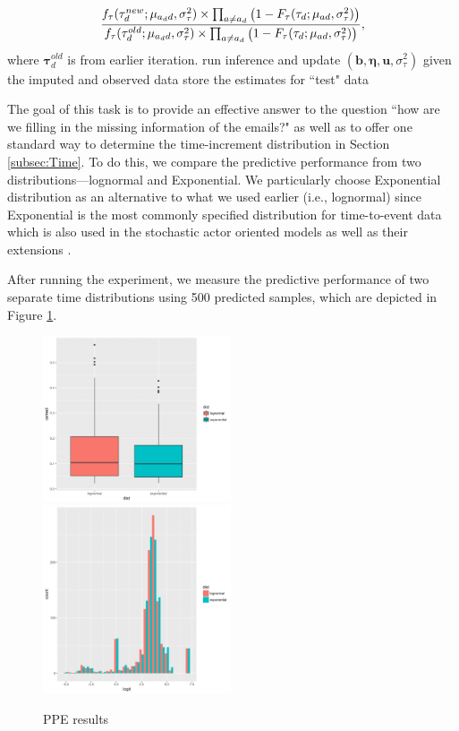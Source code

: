\documentclass[12pt]{article}
\begin{document}
{\begin{algorithm}[!t]
\begin{algorithmic}
\begin{equation*}
			\footnotesize
			\frac{f_{\tau}(\tau^{new}_{d}; \mu_{a_d d}, \sigma_\tau^2)\times \prod_{a\neq a_d}\big(1-F_{\tau}(\tau_{d}; \mu_{a d}, \sigma_\tau^2) \big) }{f_{\tau}(\tau^{old}_{d}; \mu_{a_d d}, \sigma_\tau^2)\times \prod_{a\neq a_d}\big(1-F_{\tau}(\tau_{d}; \mu_{a d}, \sigma_\tau^2) \big)},
			\end{equation*}
			where $\boldsymbol{\tau}^{old}_d$ is from earlier iteration.
			\ENDIF
			\STATE run inference and update $(\boldsymbol{b}, \boldsymbol{\eta},\boldsymbol{u}, \sigma^2_\tau)$ given the imputed and observed data
			\ENDFOR
			\STATE store the estimates for ``test" data
			\ENDFOR
		\end{algorithmic}
	\end{algorithm}
	
The goal of this task is to provide an effective answer to the question ``how are we filling in the missing information of the emails?" as well as to offer one standard way to determine the time-increment distribution in Section \ref{subsec:Time}. To do this, we compare the predictive performance from two distributions---lognormal and Exponential. We particularly choose Exponential distribution as an alternative to what we used earlier (i.e., lognormal) since Exponential is the most commonly specified distribution for time-to-event data which is also used in the stochastic actor oriented models \citep{snijders1996stochastic} as well as their extensions \citep{snijders2007modeling}.

After running the experiment, we measure the predictive performance of two separate time distributions using 500 predicted samples, which are depicted in Figure \ref{figure:PPEresults}.
	\begin{figure}[!b]
		\centering
		\includegraphics[width=0.495\textwidth]{plots_paper/senderpredict-1.png}	
		\includegraphics[width=0.495\textwidth]{plots_paper/receiverpredict2-1.png}	
		\caption {PPE results}
		\label{figure:PPEresults}
	\end{figure}
	
}
\end{document}
